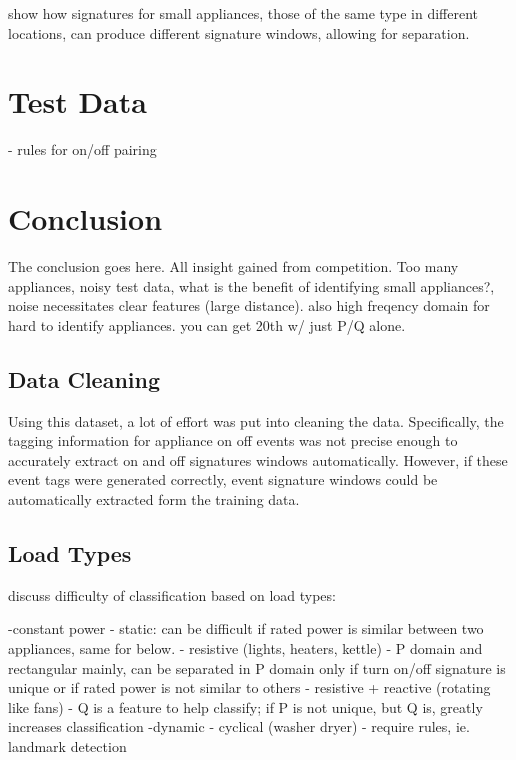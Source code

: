 \documentclass[conference]{IEEEtran}
\begin{document}
show how signatures for small appliances, those of the same type in different locations, can produce different signature windows, allowing for separation.

\section{Test Data}\label{sec:test}
- rules for on/off pairing

\section{Conclusion}\label{sec:concl}
The conclusion goes here. All insight gained from competition. Too many appliances, noisy test data, what is the benefit of identifying small appliances?, noise necessitates clear features (large distance).  also high freqency domain for hard to identify appliances.  you can get 20th w/ just P/Q alone.   

\subsection{Data Cleaning}
Using this dataset, a lot of effort was put into cleaning the data.  Specifically, the tagging information for appliance on off events was not precise enough to accurately extract on and off signatures windows automatically.  However, if these event tags were generated correctly, event signature windows could be automatically extracted form the training data. 

\subsection{Load Types}
discuss difficulty of classification based on load types:

-constant power - static: can be difficult if rated power is similar between two appliances, same for below.
- resistive (lights, heaters, kettle) - P domain and rectangular mainly, can be separated in P domain only if turn on/off signature is unique or if rated power is not similar to others
- resistive + reactive (rotating like fans) - Q is a feature to help classify; if P is not unique, but Q is, greatly increases classification
-dynamic
	- cyclical (washer dryer) - require rules, ie. landmark detection





\end{document}
